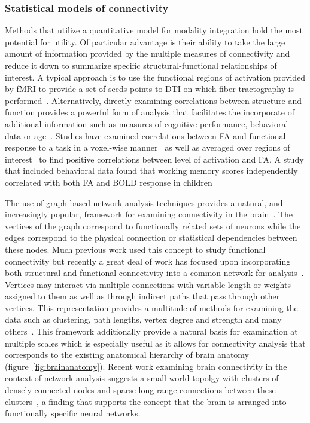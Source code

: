 \subsubsection{Statistical models of connectivity}
Methods that utilize a quantitative model for modality integration hold the most potential for utility. Of particular advantage is their ability to take the large amount of information provided by the multiple measures of connectivity and reduce it down to summarize specific structural-functional relationships of interest. A typical approach is to use the functional regions of activation provided by fMRI to provide a set of seeds points to DTI on which fiber tractography is performed~\cite{Dougherty2005,Guye2003,Johansen-Berg2004,Kim2005,Kim2006,Schonberg2006}. Alternatively, directly examining correlations between structure and function provides a powerful form of analysis that facilitates the incorporate of additional information such as measures of cognitive performance, behavioral data or age~\cite{Baird2005,Madden2007}. Studies have examined correlations between FA and functional response to a task in a voxel-wise manner~\cite{Powell2006} as well as averaged over regions of interest~\cite{Toosy2004} to find positive correlations between level of activation and FA. A study that included behavioral data found that working memory scores independently correlated with both FA and BOLD response in children~\cite{Olesen2003}

The use of graph-based network analysis techniques provides a natural, and increasingly popular, framework for examining connectivity in the brain~\cite{Hagmann2007,Iturria-Medina2007,Iturria-Medina2008,Hagmann2008,Honey2007,Achard2006}. The vertices of the graph correspond to functionally related sets of neurons while the edges correspond to the physical connection or statistical dependencies between these nodes. Much previous work used this concept to study functional connectivity but recently a great deal of work has focused upon incorporating both structural and functional connectivity into a common network for analysis~\cite{Werring1998a,Werring1999b,Wieshmann2001,Honey2009,Bullmore2009,Koch2002a,Skudlarski2008}. Vertices may interact via multiple connections with variable length or weights assigned to them as well as through indirect paths that pass through other vertices. This representation provides a multitude of methods for examining the data such as clustering, path lengths, vertex degree and strength and many others~\cite{Brandes2005}. This framework additionally provide a natural basis for examination at multiple scales which is especially useful as it allows for connectivity analysis that corresponds to the existing anatomical hierarchy of brain anatomy (figure~\ref{fig:brainanatomy}). Recent work examining brain connectivity in the context of network analysis suggests a small-world topolgy with clusters of densely connected nodes and sparse long-range connections between these clusters~\cite{Bassett2006}, a finding that supports the concept that the brain is arranged into functionally specific neural networks.


